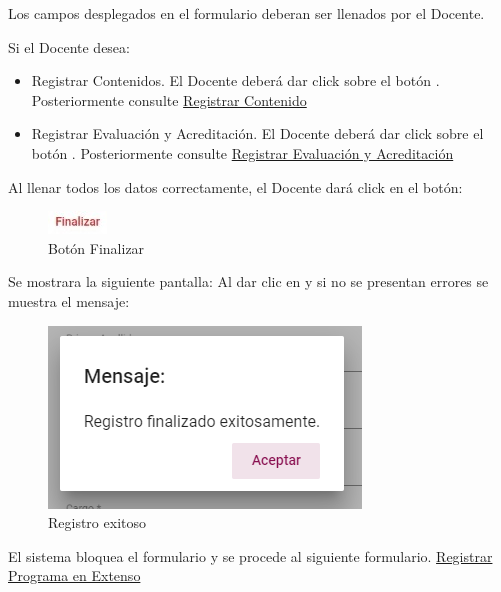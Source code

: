 Los campos desplegados en el formulario deberan ser llenados por el Docente.

Si el Docente desea:

\begin{itemize}
    \item Registrar Contenidos. El Docente deberá dar click sobre el botón . Posteriormente consulte \hyperlink{Registrar Contenido}{Registrar Contenido}
    \item Registrar Evaluación y Acreditación. El Docente deberá dar click sobre el botón . Posteriormente consulte \hyperlink{REyA}{Registrar Evaluación y Acreditación}
\end{itemize}

Al llenar todos los datos correctamente, el Docente dará click en el botón:

\begin{figure}[H]
    \centering
    \includegraphics[width=0.1\linewidth]{images/SP6/BotonFinalizar.jpeg}
    \caption{Botón Finalizar}
\end{figure}

Se mostrara la siguiente pantalla:
Al dar clic en  y si no se presentan errores se muestra el mensaje:


\begin{figure}[H]
    \centering
    \includegraphics[width=0.4\linewidth]{images/SP6/MSG5.png}
    \caption{Registro exitoso}
    \label{mensaje5}
\end{figure}


El sistema bloquea el formulario y se procede al siguiente formulario. \hyperlink{RPE}{Registrar Programa en Extenso}


